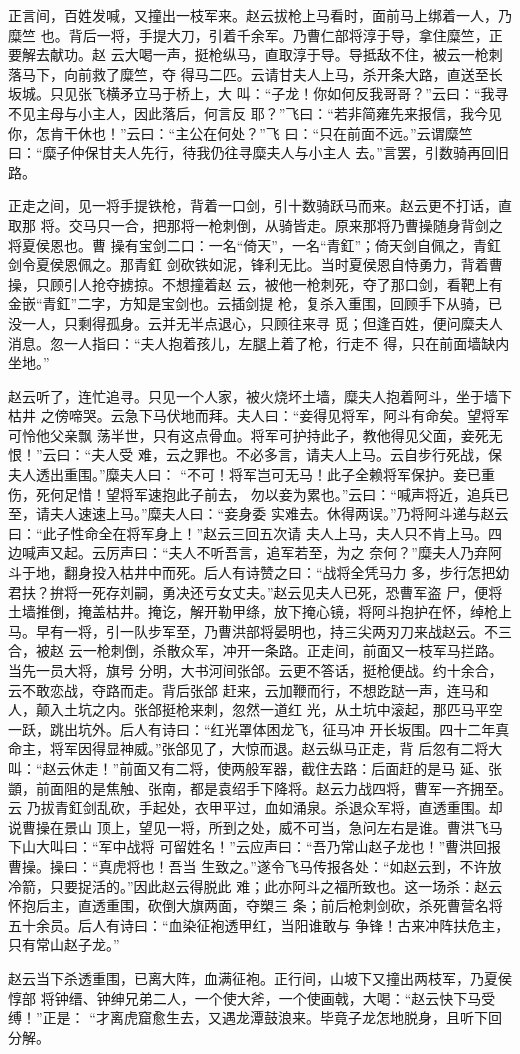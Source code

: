 正言间，百姓发喊，又撞出一枝军来。赵云拔枪上马看时，面前马上绑着一人，乃糜竺
也。背后一将，手提大刀，引着千余军。乃曹仁部将淳于导，拿住糜竺，正要解去献功。赵
云大喝一声，挺枪纵马，直取淳于导。导抵敌不住，被云一枪刺落马下，向前救了糜竺，夺
得马二匹。云请甘夫人上马，杀开条大路，直送至长坂城。只见张飞横矛立马于桥上，大
叫：“子龙！你如何反我哥哥？”云曰：“我寻不见主母与小主人，因此落后，何言反
耶？”飞曰：“若非简雍先来报信，我今见你，怎肯干休也！”云曰：“主公在何处？”飞
曰：“只在前面不远。”云谓糜竺曰：“糜子仲保甘夫人先行，待我仍往寻糜夫人与小主人
去。”言罢，引数骑再回旧路。

正走之间，见一将手提铁枪，背着一口剑，引十数骑跃马而来。赵云更不打话，直取那
将。交马只一合，把那将一枪刺倒，从骑皆走。原来那将乃曹操随身背剑之将夏侯恩也。曹
操有宝剑二口：一名“倚天”，一名“青釭”；倚天剑自佩之，青釭剑令夏侯恩佩之。那青釭
剑砍铁如泥，锋利无比。当时夏侯恩自恃勇力，背着曹操，只顾引人抢夺掳掠。不想撞着赵
云，被他一枪刺死，夺了那口剑，看靶上有金嵌“青釭”二字，方知是宝剑也。云插剑提
枪，复杀入重围，回顾手下从骑，已没一人，只剩得孤身。云并无半点退心，只顾往来寻
觅；但逢百姓，便问糜夫人消息。忽一人指曰：“夫人抱着孩儿，左腿上着了枪，行走不
得，只在前面墙缺内坐地。”

赵云听了，连忙追寻。只见一个人家，被火烧坏土墙，糜夫人抱着阿斗，坐于墙下枯井
之傍啼哭。云急下马伏地而拜。夫人曰：“妾得见将军，阿斗有命矣。望将军可怜他父亲飘
荡半世，只有这点骨血。将军可护持此子，教他得见父面，妾死无恨！”云曰：“夫人受
难，云之罪也。不必多言，请夫人上马。云自步行死战，保夫人透出重围。”糜夫人曰：
“不可！将军岂可无马！此子全赖将军保护。妾已重伤，死何足惜！望将军速抱此子前去，
勿以妾为累也。”云曰：“喊声将近，追兵已至，请夫人速速上马。”糜夫人曰：“妾身委
实难去。休得两误。”乃将阿斗递与赵云曰：“此子性命全在将军身上！”赵云三回五次请
夫人上马，夫人只不肯上马。四边喊声又起。云厉声曰：“夫人不听吾言，追军若至，为之
奈何？”糜夫人乃弃阿斗于地，翻身投入枯井中而死。后人有诗赞之曰：“战将全凭马力
多，步行怎把幼君扶？拚将一死存刘嗣，勇决还亏女丈夫。”赵云见夫人已死，恐曹军盗
尸，便将土墙推倒，掩盖枯井。掩讫，解开勒甲绦，放下掩心镜，将阿斗抱护在怀，绰枪上
马。早有一将，引一队步军至，乃曹洪部将晏明也，持三尖两刃刀来战赵云。不三合，被赵
云一枪刺倒，杀散众军，冲开一条路。正走间，前面又一枝军马拦路。当先一员大将，旗号
分明，大书河间张郃。云更不答话，挺枪便战。约十余合，云不敢恋战，夺路而走。背后张郃
赶来，云加鞭而行，不想趷跶一声，连马和人，颠入土坑之内。张郃挺枪来刺，忽然一道红
光，从土坑中滚起，那匹马平空一跃，跳出坑外。后人有诗曰：“红光罩体困龙飞，征马冲
开长坂围。四十二年真命主，将军因得显神威。”张郃见了，大惊而退。赵云纵马正走，背
后忽有二将大叫：“赵云休走！”前面又有二将，使两般军器，截住去路：后面赶的是马
延、张顗，前面阻的是焦触、张南，都是袁绍手下降将。赵云力战四将，曹军一齐拥至。云
乃拔青釭剑乱砍，手起处，衣甲平过，血如涌泉。杀退众军将，直透重围。却说曹操在景山
顶上，望见一将，所到之处，威不可当，急问左右是谁。曹洪飞马下山大叫曰：“军中战将
可留姓名！”云应声曰：“吾乃常山赵子龙也！”曹洪回报曹操。操曰：“真虎将也！吾当
生致之。”遂令飞马传报各处：“如赵云到，不许放冷箭，只要捉活的。”因此赵云得脱此
难；此亦阿斗之福所致也。这一场杀：赵云怀抱后主，直透重围，砍倒大旗两面，夺槊三
条；前后枪刺剑砍，杀死曹营名将五十余员。后人有诗曰：“血染征袍透甲红，当阳谁敢与
争锋！古来冲阵扶危主，只有常山赵子龙。”

赵云当下杀透重围，已离大阵，血满征袍。正行间，山坡下又撞出两枝军，乃夏侯惇部
将钟缙、钟绅兄弟二人，一个使大斧，一个使画戟，大喝：“赵云快下马受缚！”正是：
“才离虎窟愈生去，又遇龙潭鼓浪来。毕竟子龙怎地脱身，且听下回分解。